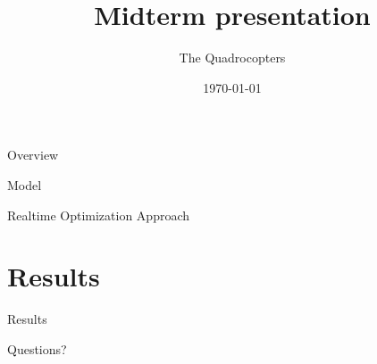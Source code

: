 \documentclass[12pt]{beamer}
\title{Midterm presentation}
\author{The Quadrocopters}
\institute{Technische Universität München}
\date{\today}
\begin{document}
\begin{frame}
\maketitle
\end{frame}

\begin{frame}{Overview}
\tableofcontents
\end{frame}

%


\begin{frame}{ }
\begin{block}{ }
\centering
\LARGE
 \vspace{1ex}
Model \\
\vspace{1ex}
\end{block}
\end{frame}

\begin{frame}{ }
\begin{block}{ }
\centering
\LARGE
 \vspace{1ex}
Realtime Optimization Approach\\
\vspace{1ex}
\end{block}
\end{frame}


\section{Results}
\begin{frame}{ }
\begin{block}{ }
\centering
\LARGE
 \vspace{1ex}
Results\\
\vspace{1ex}
\end{block}
\end{frame}

\begin{frame}{ }
\begin{block}{ }
\centering
\LARGE
 \vspace{1ex}
Questions? \\
\vspace{1ex}
\end{block}
\end{frame}
\end{document}
